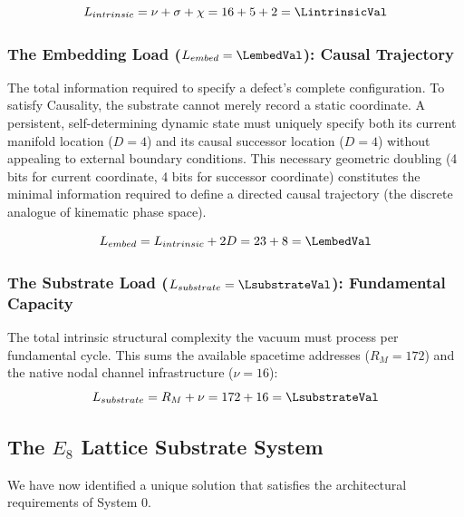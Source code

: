 \begin{equation}
    L_{intrinsic} = \nu + \sigma + \chi = 16 + 5 + 2 = \mathbf{\LintrinsicVal}
\end{equation}

\subsubsection{The Embedding Load (\texorpdfstring{$L_{embed} = \LembedVal$}{Lembed}): Causal Trajectory}
\label{subsec:lembed}
The total information required to specify a defect's complete configuration. To satisfy Causality, the substrate cannot merely record a static coordinate. A persistent, self-determining dynamic state must uniquely specify both its current manifold location ($D=4$) and its causal successor location ($D=4$) without appealing to external boundary conditions. This necessary geometric doubling (4 bits for current coordinate, 4 bits for successor coordinate) constitutes the minimal information required to define a directed causal trajectory (the discrete analogue of kinematic phase space).

\begin{equation}
    L_{embed} = L_{intrinsic} + 2D = 23 + 8 = \mathbf{\LembedVal}
\end{equation}

\subsubsection{The Substrate Load (\texorpdfstring{$L_{substrate} = \LsubstrateVal$}{Loverhead}): Fundamental Capacity}
\label{subsub:lsubstrate}
The total intrinsic structural complexity the vacuum must process per fundamental cycle. This sums the available spacetime addresses ($R_M = 172$) and the native nodal channel infrastructure ($\nu=16$):
\begin{equation}
    L_{substrate} = R_M + \nu = 172 + 16 = \mathbf{\LsubstrateVal}
\end{equation}

\subsection{The \texorpdfstring{$E_8$}{E8} Lattice Substrate System}
\label{sec:system1spec}
We have now identified a unique solution that satisfies the architectural requirements of System 0.

